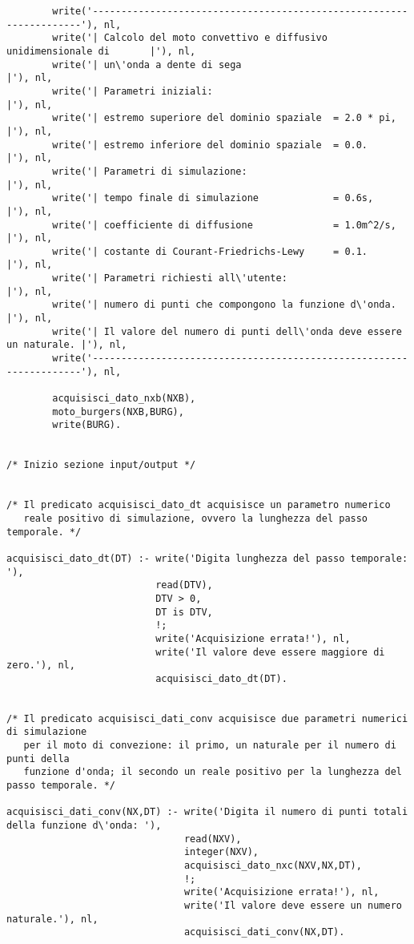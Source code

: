 \begin{verbatim}
        write('--------------------------------------------------------------------'), nl,
        write('| Calcolo del moto convettivo e diffusivo unidimensionale di       |'), nl,
        write('| un\'onda a dente di sega                                          |'), nl,
        write('| Parametri iniziali:                                              |'), nl,
        write('| estremo superiore del dominio spaziale  = 2.0 * pi,              |'), nl,
        write('| estremo inferiore del dominio spaziale  = 0.0.                   |'), nl, 
        write('| Parametri di simulazione:                                        |'), nl,
        write('| tempo finale di simulazione             = 0.6s,                  |'), nl, 
        write('| coefficiente di diffusione              = 1.0m^2/s,              |'), nl, 
        write('| costante di Courant-Friedrichs-Lewy     = 0.1.                   |'), nl, 
        write('| Parametri richiesti all\'utente:                                  |'), nl, 
        write('| numero di punti che compongono la funzione d\'onda.               |'), nl,
        write('| Il valore del numero di punti dell\'onda deve essere un naturale. |'), nl,
        write('--------------------------------------------------------------------'), nl,

        acquisisci_dato_nxb(NXB),                                                          
        moto_burgers(NXB,BURG),
        write(BURG).


/* Inizio sezione input/output */
   

/* Il predicato acquisisci_dato_dt acquisisce un parametro numerico
   reale positivo di simulazione, ovvero la lunghezza del passo temporale. */

acquisisci_dato_dt(DT) :- write('Digita lunghezza del passo temporale: '),
                          read(DTV),
                          DTV > 0,
                          DT is DTV,
                          !;     
                          write('Acquisizione errata!'), nl,
                          write('Il valore deve essere maggiore di zero.'), nl,
                          acquisisci_dato_dt(DT).


/* Il predicato acquisisci_dati_conv acquisisce due parametri numerici di simulazione 
   per il moto di convezione: il primo, un naturale per il numero di punti della 
   funzione d'onda; il secondo un reale positivo per la lunghezza del passo temporale. */

acquisisci_dati_conv(NX,DT) :- write('Digita il numero di punti totali della funzione d\'onda: '),
                               read(NXV),
                               integer(NXV),
                               acquisisci_dato_nxc(NXV,NX,DT),
                               !;     
                               write('Acquisizione errata!'), nl,
                               write('Il valore deve essere un numero naturale.'), nl,
                               acquisisci_dati_conv(NX,DT).


\end{verbatim}
